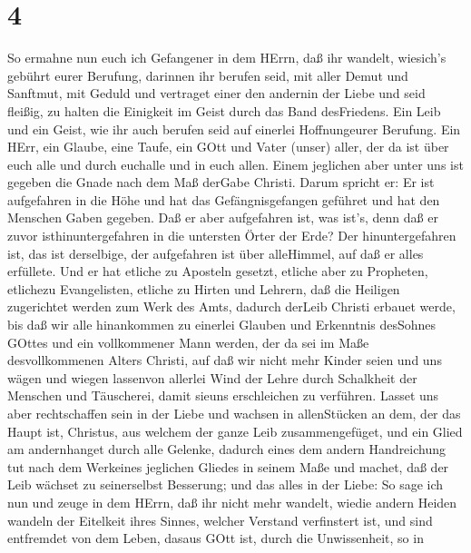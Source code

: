\hypertarget{section-3}{%
\section{4}\label{section-3}}

 So ermahne nun euch ich Gefangener in dem HErrn, daß ihr
wandelt, wiesich's gebührt eurer Berufung, darinnen ihr berufen seid,
 mit aller Demut und Sanftmut, mit Geduld und vertraget
einer den andernin der Liebe  und seid fleißig, zu halten
die Einigkeit im Geist durch das Band desFriedens.  Ein Leib
und ein Geist, wie ihr auch berufen seid auf einerlei Hoffnungeurer
Berufung.  Ein HErr, ein Glaube, eine Taufe, 
ein GOtt und Vater (unser) aller, der da ist über euch alle und durch
euchalle und in euch allen.  Einem jeglichen aber unter uns
ist gegeben die Gnade nach dem Maß derGabe Christi.  Darum
spricht er: Er ist aufgefahren in die Höhe und hat das Gefängnisgefangen
geführet und hat den Menschen Gaben gegeben.  Daß er aber
aufgefahren ist, was ist's, denn daß er zuvor isthinuntergefahren in die
untersten Örter der Erde?  Der hinuntergefahren ist, das
ist derselbige, der aufgefahren ist über alleHimmel, auf daß er alles
erfüllete.  Und er hat etliche zu Aposteln gesetzt, etliche
aber zu Propheten, etlichezu Evangelisten, etliche zu Hirten und
Lehrern,  daß die Heiligen zugerichtet werden zum Werk des
Amts, dadurch derLeib Christi erbauet werde,  bis daß wir
alle hinankommen zu einerlei Glauben und Erkenntnis desSohnes GOttes und
ein vollkommener Mann werden, der da sei im Maße desvollkommenen Alters
Christi,  auf daß wir nicht mehr Kinder seien und uns wägen
und wiegen lassenvon allerlei Wind der Lehre durch Schalkheit der
Menschen und Täuscherei, damit sieuns erschleichen zu verführen.
 Lasset uns aber rechtschaffen sein in der Liebe und
wachsen in allenStücken an dem, der das Haupt ist, Christus,
 aus welchem der ganze Leib zusammengefüget, und ein Glied
am andernhanget durch alle Gelenke, dadurch eines dem andern
Handreichung tut nach dem Werkeines jeglichen Gliedes in seinem Maße und
machet, daß der Leib wächset zu seinerselbst Besserung; und das alles in
der Liebe:  So sage ich nun und zeuge in dem HErrn, daß ihr
nicht mehr wandelt, wiedie andern Heiden wandeln der Eitelkeit ihres
Sinnes,  welcher Verstand verfinstert ist, und sind
entfremdet von dem Leben, dasaus GOtt ist, durch die Unwissenheit, so in
